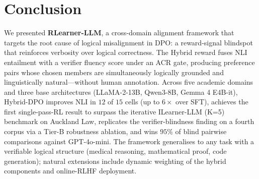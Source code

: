 \section{Conclusion}

We presented \textbf{RLearner-LLM}, a cross-domain alignment framework that targets the root cause of logical misalignment in DPO: a reward-signal blindspot that reinforces verbosity over logical correctness. The Hybrid reward fuses NLI entailment with a verifier fluency score under an ACR gate, producing preference pairs whose chosen members are simultaneously logically grounded and linguistically natural---without human annotation. Across five academic domains and three base architectures (LLaMA-2-13B, Qwen3-8B, Gemma 4 E4B-it), Hybrid-DPO improves NLI in $12$ of $15$ cells (up to $6\times$ over SFT), achieves the first single-pass-RL result to surpass the iterative ILearner-LLM (K=5) benchmark on Auckland Law, replicates the verifier-blindness finding on a fourth corpus via a Tier-B robustness ablation, and wins $95\%$ of blind pairwise comparisons against GPT-4o-mini. The framework generalises to any task with a verifiable logical structure (medical reasoning, mathematical proof, code generation); natural extensions include dynamic weighting of the hybrid components and online-RLHF deployment.
